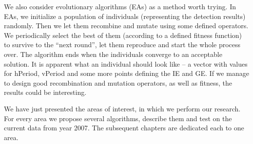 We also consider evolutionary algorithms (EAs) as a method worth trying. In EAs, we initialize a population of individuals (representing the detection results) randomly. Then we let them recombine and mutate using some defined operators. We periodically select the best of them (according to a defined fitness function) to survive to the ``next round'', let them reproduce and start the whole process over. The algorithm ends when the individuals converge to an acceptable solution.  It is apparent what an individual should look like -- a vector with values for hPeriod, vPeriod and some more points defining the IE and GE. If we manage to design good recombination and mutation operators, as well as fitness, the results could be interesting.

We have just presented the areas of interest, in which we perform our research. For every area we propose several algorithms, describe them and test on the current data from year 2007. The subsequent chapters are dedicated each to one area.
